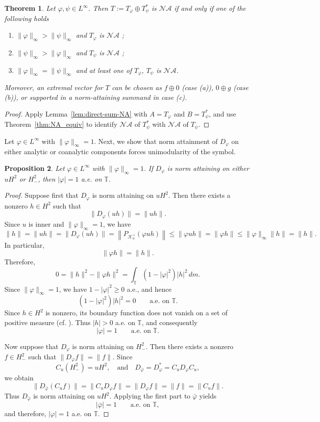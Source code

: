 \documentclass[12pt]{amsart}
\newtheorem{theorem}{Theorem}[section]
\newtheorem{proposition}[theorem]{Proposition}
\theoremstyle{definition}
\theoremstyle{remark}
\def \T{\mathbb{T}}
\newcommand{\clk}{\mathcal{K}}
\newcommand{\na}{\mathcal{NA}}
\newcommand{\vp}{\varphi}
\numberwithin{equation}{section}
\begin{document}
\begin{theorem}\label{thm:NA-direct-sum-Toeplitz}
Let $\vp,\psi\in L^\infty$. Then $T:=T_\vp\oplus T_\psi^*$ is $\na$ if and only if one of the following holds
\begin{enumerate}
\item[\textup{(a)}] $\|\vp\|_\infty>\|\psi\|_\infty$ and $T_\vp$ is $\na$ ;
\item[\textup{(b)}] $\|\psi\|_\infty>\|\vp\|_\infty$ and $T_\psi$ is $\na$ ;
\item[\textup{(c)}] $\|\vp\|_\infty=\|\psi\|_\infty$ and at least one of $T_\vp$, $T_\psi$ is $\na$.
\end{enumerate}
Moreover, an extremal vector for $T$ can be chosen as $f\oplus 0$ (case \textup{(a)}), $0\oplus g$ (case \textup{(b)}), or supported in a norm-attaining summand in case \textup{(c)}.
\end{theorem}

\begin{proof}
Apply Lemma~\ref{lem:direct-sum-NA} with $A=T_\vp$ and $B=T_\psi^*$, and use Theorem~\ref{thm:NA_equiv} to identify $\na$ of $T_\psi^*$ with $\na$ of $T_\psi$.
\end{proof}







Let $\vp\in L^\infty$ with $\|\vp\|_\infty=1$. Next, we show that norm attainment of $D_\vp$ on either analytic or coanalytic components forces unimodularity of the symbol.
\begin{proposition}\label{prop:componentwise-unimodular}
Let $\vp\in L^\infty$ with $\|\vp\|_{\infty}=1$. If $D_\vp$ is norm attaining on either $uH^2$ or $H^2_{-}$, then $|\vp|=1$ a.e. on $\T$.
\end{proposition}

\begin{proof}
Suppose first that $D_\vp$ is norm attaining on $uH^2$. Then there exists a nonzero $h\in H^2$ such that
\[
\|D_\vp(uh)\|=\|uh\|.
\]
Since $u$ is inner and $\|\vp\|_\infty=1$, we have
\[
\|h\|=\|uh\|=\|D_\vp(uh)\| =\left\|P_{\clk_u^\perp}(\vp uh)\right\|\leq \|\vp uh\|
=\|\vp h\|\leq \|\vp\|_\infty\|h\|=\|h\|.
\]
In particular,
\[
\|\vp h\|=\|h\|.
\]
Therefore,
\[
0=\|h\|^2-\|\vp h\|^2=\int_{\T}(1-|\vp|^2)|h|^2\,dm.
\]
Since $\|\vp\|_\infty=1$, we have $1-|\vp|^2\geq0$ a.e., and hence
\[
(1-|\vp|^2)|h|^2=0\qquad\text{a.e. on }\T.
\]
Since $h\in H^2$ is nonzero, its boundary function does not vanish on a set of positive measure (cf. \cite[Theorem 6.3]{Douglas1998}). Thus $|h|>0$ a.e. on $\T$, and consequently
\[
|\vp|=1\qquad\text{a.e. on }\T.
\]
	
Now suppose that $D_\vp$ is norm attaining on $H^2_{-}$. Then there exists a nonzero $f\in H^2_{-}$ such that $\|D_\vp f\|=\|f\|$. Since
\[
C_u(H^2_{-})=uH^2,
\quad\text{and}\quad
D_{\bar{\vp}}=D_\vp^*=C_uD_\vp C_u,
\]
we obtain
\[
\|D_{\bar{\vp}}(C_uf)\| =\|C_uD_\vp f\|=\|D_\vp f\|=\|f\|=\|C_uf\|.
\]
Thus $D_{\bar{\vp}}$ is norm attaining on $uH^2$. Applying the first part to $\bar{\vp}$ yields
\[
|\bar{\vp}|=1\qquad\text{a.e. on }\T,
\]
and therefore, $|\vp|=1$ a.e. on $\T$.
\end{proof}
   
\end{document}
